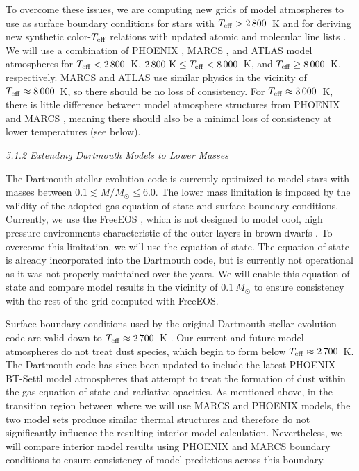 To overcome these issues, we are computing new grids of model atmospheres to use as surface boundary conditions for stars with $T_{\rm eff} > 2\,800$~K and for deriving new synthetic color-$T_{\rm eff}$ relations with updated atomic and molecular line lists \citep{Plez2012}. We will use a combination of PHOENIX \citep{Allard2011}, MARCS \citep{Gustafsson2008}, and ATLAS \citep{Castelli2004} model atmospheres for $T_{\rm eff} < 2\,800$~K, $2\,800 \textrm{ K} \le T_{\rm eff} < 8\,000$~K, and $T_{\rm eff} \ge 8\,000$~K, respectively. MARCS and ATLAS use similar physics in the vicinity of $T_{\rm eff} \approx 8\,000$~K, so there should be no loss of consistency. For $T_{\rm eff} \approx 3\,000$~K, there is little difference between model atmosphere structures from PHOENIX and MARCS \citep{Gustafsson2008}, meaning there should also be a minimal loss of consistency at lower temperatures (see below).

{\it 5.1.2 Extending Dartmouth Models to Lower Masses}

The Dartmouth stellar evolution code is currently optimized to model stars with masses between $0.1 \lesssim M/M_{\odot} \le 6.0$. The lower mass limitation is imposed by the validity of the adopted gas equation of state and surface boundary conditions. Currently, we use the FreeEOS \citep{Irwin2007}, which is not designed to model cool, high pressure environments characteristic of the outer layers in brown dwarfs \citep{Chabrier2000}. To overcome this limitation, we will use the \citet{scvh95} equation of state. The equation of state is already incorporated into the Dartmouth code, but is currently not operational as it was not properly maintained over the years. We will enable this equation of state and compare model results in the vicinity of $0.1\ M_{\odot}$ to ensure consistency with the rest of the grid computed with FreeEOS.

Surface boundary conditions used by the original Dartmouth stellar evolution code are valid down to $T_{\rm eff} \approx 2\,700$~K \citep{Hauschildt1999a}. Our current \citep{Hauschildt1999a} and future \citep{Gustafsson2008} model atmospheres do not treat dust species, which begin to form below $T_{\rm eff} \approx 2\,700$~K. The Dartmouth code has since been updated to include the latest PHOENIX BT-Settl model atmospheres \citep{Allard2011} that attempt to treat the formation of dust within the gas equation of state and radiative opacities. As mentioned above, in the transition region between where we will use MARCS and PHOENIX models, the two model sets produce similar thermal structures and therefore do not significantly influence the resulting interior model calculation. Nevertheless, we will compare interior model results using PHOENIX and MARCS boundary conditions to ensure consistency of model predictions across this boundary.

